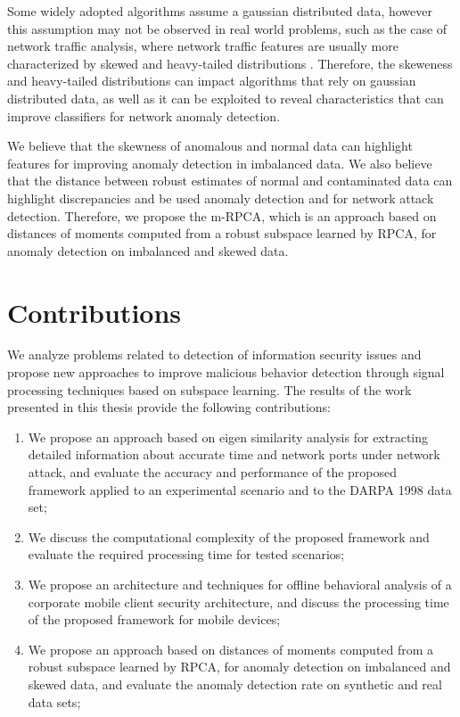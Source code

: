Some widely adopted algorithms assume a gaussian distributed data, however this assumption may not be observed in real world problems, such as the case of network traffic analysis, where network traffic features are usually more characterized by skewed and heavy-tailed distributions \cite{lakhina2005mining,benson2010network, leon2017probability}. Therefore, the skeweness and heavy-tailed distributions can impact algorithms that rely on gaussian distributed data, as well as it can be exploited to reveal characteristics that can improve classifiers for network anomaly detection. 

We believe that the skewness of anomalous and normal data can highlight features for improving anomaly detection in imbalanced data. We also believe that the distance between robust estimates of normal and contaminated data can highlight discrepancies and be used anomaly detection and for network attack detection. Therefore, we propose the m-RPCA, which is an approach based on  distances of moments computed from a robust subspace learned by RPCA, for anomaly detection on imbalanced and skewed data.

\section{Contributions}
\label{sc:contributions}

We analyze problems related to detection of information security issues and propose new approaches to improve malicious behavior detection through signal processing techniques based on subspace learning. The results of the work presented in this thesis provide the following contributions:

\begin{enumerate}
	\item We propose an approach based on eigen similarity analysis for extracting detailed information about accurate time and network ports under network attack, and evaluate the accuracy and performance of the proposed framework applied to an experimental scenario and to the DARPA 1998 data set;
	\item We discuss the computational complexity of the proposed framework and evaluate the required processing time for tested scenarios;
	\item We propose an architecture and techniques for offline behavioral analysis of a corporate mobile client security architecture, and discuss the processing time of the proposed framework for mobile devices;
	\item We propose an approach based on distances of moments computed from a robust subspace learned by RPCA, for anomaly detection on imbalanced and skewed data, and evaluate the anomaly detection rate on synthetic and real data sets;
\end{enumerate}

